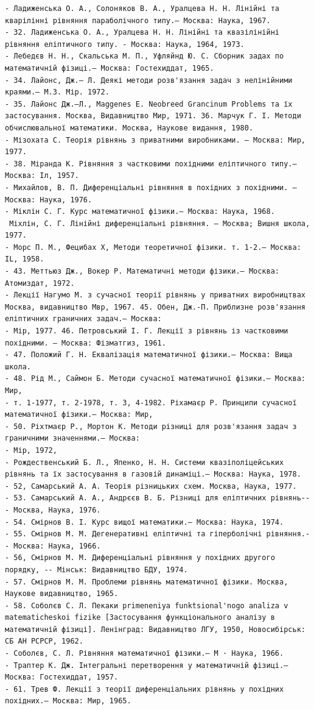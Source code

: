 \documentclass[
  ukrainian,
]{article}
\begin{document}
\begin{verbatim}
- Ладиженська О. А., Солоняков В. А., Уралцева Н. Н. Лінійні та кварілінні рівняння параболічного типу.— Москва: Наука, 1967.
- 32. Ладиженська О. А., Уралцева Н. Н. Лінійні та квазілінійні рівняння еліптичного типу. - Москва: Наука, 1964, 1973.
- Лебедєв Н. Н., Скальська М. П., Уфляйнд Ю. С. Сборник задах по математичній фізиці.— Москва: Гостехиддат, 1965.
- 34. Лайонс, Дж.— Л. Деякі методи розв'язання задач з нелінійними краями.— М.З. Мір. 1972.
- 35. Лайонс Дж.—Л., Maggenes E. Neobreed Grancinum Problems та їх застосування. Москва, Видавництво Мир, 1971. 36. Марчук Г. І. Методи обчислювальної математики. Москва, Наукове видання, 1980.
- Мізохата С. Теорія рівнянь з приватними виробниками. — Москва: Мир, 1977.
- 38. Міранда К. Рівняння з частковими похідними еліптичного типу.— Москва: Іл, 1957.
- Михайлов, В. П. Диференціальні рівняння в похідних з похідними. — Москва: Наука, 1976.
- Міклін С. Г. Курс математичної фізики.— Москва: Наука, 1968.
 Міхлін, С. Г. Лінійні диференціальні рівняння. — Москва; Вишня школа, 1977.
- Морс П. М., Фецибах X, Методи теоретичної фізики. т. 1-2.— Москва: IL, 1958.
- 43. Меттьюз Дж., Вокер Р. Математичні методи фізики.— Москва: Атомиздат, 1972.
- Лекції Нагумо М. з сучасної теорії рівнянь у приватних виробництвах Москва, видавництво Мвр, 1967. 45. Обен, Дж.-П. Приблизне розв'язання еліптичних граничних задач.— Москва:
- Мір, 1977. 46. Петровський І. Г. Лекції з рівнянь із частковими похідними. — Москва: Фізматгиз, 1961.
- 47. Положий Г. Н. Еквалізація математичної фізики.— Москва: Вища школа.
- 48. Рід М., Саймон Б. Методи сучасної математичної фізики.— Москва: Мир,
- т. 1-1977, т. 2-1978, т. 3, 4-1982. Ріхамаєр Р. Принципи сучасної математичної фізики.— Москва: Мир,
- 50. Ріхтмаєр Р., Мортон К. Методи різниці для розв'язання задач з граничними значеннями.— Москва:
- Мір, 1972,
- Рождественський Б. Л., Япенко, Н. Н. Системи квазіполіцейських рівнянь та їх застосування в газовій динаміці.— Москва: Наука, 1978.
- 52, Самарський А. А. Теорія різницьких схем. Москва, Наука, 1977.
- 53. Самарський А. А., Андрєєв В. Б. Різниці для еліптичних рівнянь--- Москва, Наука, 1976.
- 54. Смірнов В. І. Курс вищої математики.— Москва: Наука, 1974.
- 55. Смірнов М. М. Дегенеративні еліптичні та гіперболічні рівняння.-- Москва: Наука, 1966.
- 56, Смірнов М. М. Диференціальні рівняння у похідних другого порядку, -- Мінськ: Видавництво БДУ, 1974.
- 57. Смірнов М. М. Проблеми рівнянь математичної фізики. Москва, Наукове видавництво, 1965.
- 58. Соболєв С. Л. Пекаки primeneniya funktsional'nogo analiza v matematicheskoi fizike [Застосування функціонального аналізу в математичній фізиці]. Ленінград: Видавництво ЛГУ, 1950, Новосибірськ: СБ АН РСРСР, 1962.
- Соболєв, С. Л. Рівняння математичної фізики.— М · Наука, 1966.
- Траптер К. Дж. Інтегральні перетворення у математичній фізиці.— Москва: Гостехиддат, 1957.
- 61. Трев Ф. Лекції з теорії диференціальних рівнянь у похідних похідних.— Москва: Мир, 1965.


\end{verbatim}
\end{document}
